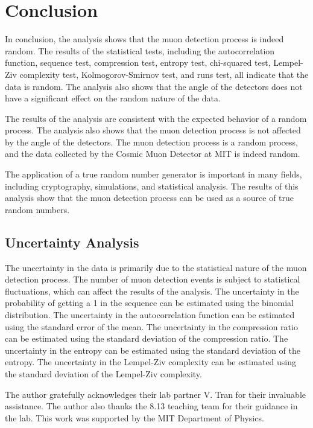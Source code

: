 \section{Conclusion}
In conclusion, the analysis shows that the muon detection process is indeed random. The results of the statistical tests, including the autocorrelation function, sequence test, compression test, entropy test, chi-squared test, Lempel-Ziv complexity test, Kolmogorov-Smirnov test, and runs test, all indicate that the data is random. The analysis also shows that the angle of the detectors does not have a significant effect on the random nature of the data.

The results of the analysis are consistent with the expected behavior of a random process. The analysis also shows that the muon detection process is not affected by the angle of the detectors. The muon detection process is a random process, and the data collected by the Cosmic Muon Detector at MIT is indeed random.

The application of a true random number generator is important in many fields, including cryptography, simulations, and statistical analysis. The results of this analysis show that the muon detection process can be used as a source of true random numbers. 

\subsection{Uncertainty Analysis}
The uncertainty in the data is primarily due to the statistical nature of the muon detection process. The number of muon detection events is subject to statistical fluctuations, which can affect the results of the analysis. The uncertainty in the probability of getting a 1 in the sequence can be estimated using the binomial distribution. The uncertainty in the autocorrelation function can be estimated using the standard error of the mean. The uncertainty in the compression ratio can be estimated using the standard deviation of the compression ratio. The uncertainty in the entropy can be estimated using the standard deviation of the entropy. The uncertainty in the Lempel-Ziv complexity can be estimated using the standard deviation of the Lempel-Ziv complexity.


\vfill\null

\begin{acknowledgments} The author gratefully acknowledges their lab partner V. Tran for their invaluable assistance. The author also thanks the 8.13 teaching team for their guidance in the lab. This work was supported by the MIT Department of Physics. 
\end{acknowledgments}





